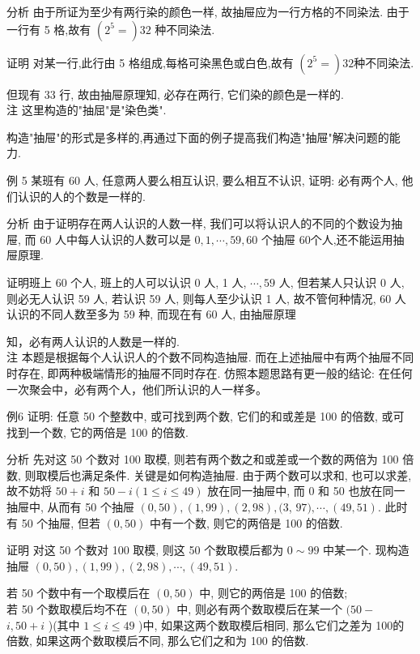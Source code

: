 \documentclass[10pt]{article}
\begin{document}
分析 由于所证为至少有两行染的颜色一样, 故抽屉应为一行方格的不同染法. 由于一行有 5 格,故有 $\left(2^{5}=\right) 32$ 种不同染法.

证明 对某一行,此行由 5 格组成,每格可染黑色或白色,故有 $\left(2^{5}=\right) 32$种不同染法.

但现有 33 行, 故由抽屉原理知, 必存在两行, 它们染的颜色是一样的.\\
注 这里构造的"抽屈"是"染色类".

构造"抽屉"的形式是多样的,再通过下面的例子提高我们构造"抽屉"解决问题的能力.

例 5 某班有 60 人, 任意两人要么相互认识, 要么相互不认识, 证明: 必有两个人, 他们认识的人的个数是一样的.

分析 由于证明存在两人认识的人数一样, 我们可以将认识人的不同的个数设为抽屉, 而 60 人中每人认识的人数可以是 $0,1, \cdots, 59,60$ 个抽屉 60个人,还不能运用抽屉原理.

证明班上 60 个人, 班上的人可以认识 0 人, 1 人, $\cdots, 59$ 人, 但若某人只认识 0 人, 则必无人认识 59 人, 若认识 59 人, 则每人至少认识 1 人, 故不管何种情况, 60 人认识的不同人数至多为 59 种, 而现在有 60 人, 由抽屉原理

知，必有两人认识的人数是一样的.\\
注 本题是根据每个人认识人的个数不同构造抽屉. 而在上述抽屉中有两个抽屉不同时存在, 即两种极端情形的抽屉不同时存在. 仿照本题思路有更一般的结论: 在任何一次聚会中，必有两个人，他们所认识的人一样多。

例6 证明: 任意 50 个整数中, 或可找到两个数, 它们的和或差是 100 的倍数, 或可找到一个数, 它的两倍是 100 的倍数.

分析 先对这 50 个数对 100 取模, 则若有两个数之和或差或一个数的两倍为 100 倍数, 则取模后也满足条件. 关键是如何构造抽屉. 由于两个数可以求和, 也可以求差, 故不妨将 $50+i$ 和 $50-i(1 \leqslant i \leqslant 49)$ 放在同一抽屉中, 而 0 和 50 也放在同一抽屉中, 从而有 50 个抽屉 $(0,50),(1,99),(2,98),(3$, $97), \cdots,(49,51)$. 此时有 50 个抽屉, 但若 $(0,50)$ 中有一个数, 则它的两倍是 100 的倍数.

证明 对这 50 个数对 100 取模, 则这 50 个数取模后都为 $0 \sim 99$ 中某一个. 现构造抽屉 $(0,50),(1,99),(2,98), \cdots,(49,51)$.

若 50 个数中有一个取模后在 $(0,50)$ 中, 则它的两倍是 100 的倍数;\\
若 50 个数取模后均不在 $(0,50)$ 中, 则必有两个数取模后在某一个 $(50-$ $i, 50+i$ )(其中 $1 \leqslant i \leqslant 49$ )中, 如果这两个数取模后相同, 那么它们之差为 100的倍数, 如果这两个数取模后不同, 那么它们之和为 100 的倍数.
\end{document}
